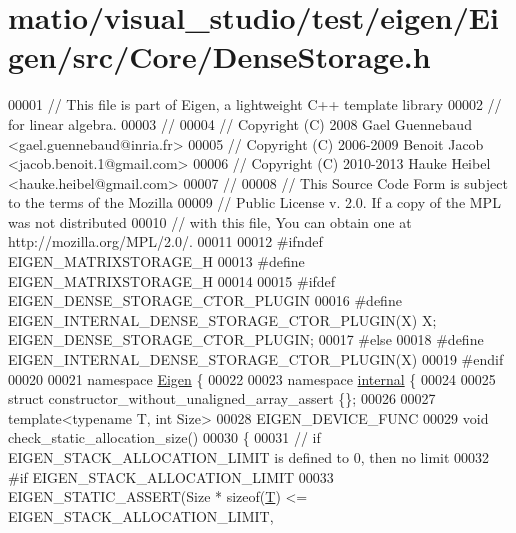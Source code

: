 \hypertarget{matio_2visual__studio_2test_2eigen_2_eigen_2src_2_core_2_dense_storage_8h_source}{}\section{matio/visual\+\_\+studio/test/eigen/\+Eigen/src/\+Core/\+Dense\+Storage.h}
\label{matio_2visual__studio_2test_2eigen_2_eigen_2src_2_core_2_dense_storage_8h_source}

\begin{DoxyCode}
00001 \textcolor{comment}{// This file is part of Eigen, a lightweight C++ template library}
00002 \textcolor{comment}{// for linear algebra.}
00003 \textcolor{comment}{//}
00004 \textcolor{comment}{// Copyright (C) 2008 Gael Guennebaud <gael.guennebaud@inria.fr>}
00005 \textcolor{comment}{// Copyright (C) 2006-2009 Benoit Jacob <jacob.benoit.1@gmail.com>}
00006 \textcolor{comment}{// Copyright (C) 2010-2013 Hauke Heibel <hauke.heibel@gmail.com>}
00007 \textcolor{comment}{//}
00008 \textcolor{comment}{// This Source Code Form is subject to the terms of the Mozilla}
00009 \textcolor{comment}{// Public License v. 2.0. If a copy of the MPL was not distributed}
00010 \textcolor{comment}{// with this file, You can obtain one at http://mozilla.org/MPL/2.0/.}
00011 
00012 \textcolor{preprocessor}{#ifndef EIGEN\_MATRIXSTORAGE\_H}
00013 \textcolor{preprocessor}{#define EIGEN\_MATRIXSTORAGE\_H}
00014 
00015 \textcolor{preprocessor}{#ifdef EIGEN\_DENSE\_STORAGE\_CTOR\_PLUGIN}
00016 \textcolor{preprocessor}{  #define EIGEN\_INTERNAL\_DENSE\_STORAGE\_CTOR\_PLUGIN(X) X; EIGEN\_DENSE\_STORAGE\_CTOR\_PLUGIN;}
00017 \textcolor{preprocessor}{#else}
00018 \textcolor{preprocessor}{  #define EIGEN\_INTERNAL\_DENSE\_STORAGE\_CTOR\_PLUGIN(X)}
00019 \textcolor{preprocessor}{#endif}
00020 
00021 \textcolor{keyword}{namespace }\hyperlink{namespace_eigen}{Eigen} \{
00022 
00023 \textcolor{keyword}{namespace }\hyperlink{namespaceinternal}{internal} \{
00024 
00025 \textcolor{keyword}{struct }constructor\_without\_unaligned\_array\_assert \{\};
00026 
00027 \textcolor{keyword}{template}<\textcolor{keyword}{typename} T, \textcolor{keywordtype}{int} Size>
00028 EIGEN\_DEVICE\_FUNC
00029 \textcolor{keywordtype}{void} check\_static\_allocation\_size()
00030 \{
00031   \textcolor{comment}{// if EIGEN\_STACK\_ALLOCATION\_LIMIT is defined to 0, then no limit}
00032 \textcolor{preprocessor}{  #if EIGEN\_STACK\_ALLOCATION\_LIMIT}
00033   EIGEN\_STATIC\_ASSERT(Size * \textcolor{keyword}{sizeof}(\hyperlink{group___sparse_core___module_class_eigen_1_1_triplet}{T}) <= EIGEN\_STACK\_ALLOCATION\_LIMIT, 

\end{DoxyCode}
